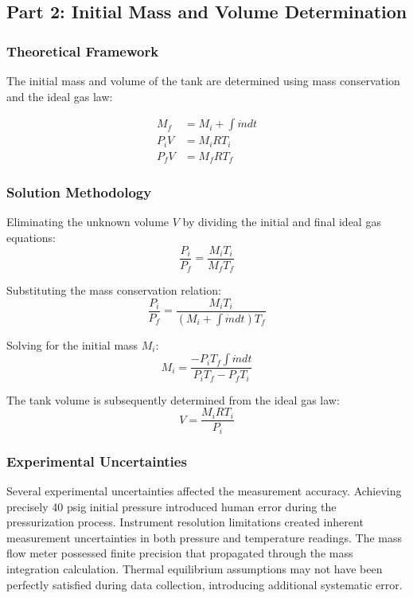 \documentclass{article} %
\begin{document}
\begin{multicols}{2}
\subsection{Part 2: Initial Mass and Volume Determination}

\subsubsection{Theoretical Framework}

The initial mass and volume of the tank are determined using mass conservation and the ideal gas law:

\begin{align}
M_f &= M_i + \int \dot{m}  dt \label{eq:mass_cons} \\
P_i V &= M_i R T_i \label{eq:ig_init} \\
P_f V &= M_f R T_f \label{eq:ig_final}
\end{align}

\subsubsection{Solution Methodology}

Eliminating the unknown volume $V$ by dividing the initial and final ideal gas equations:
\[
\frac{P_i}{P_f} = \frac{M_i T_i}{M_f T_f}
\]

Substituting the mass conservation relation:
\[
\frac{P_i}{P_f} = \frac{M_i T_i}{(M_i + \int \dot{m}  dt) T_f}
\]

Solving for the initial mass $M_i$:
\[
\boxed{M_i = \frac{-P_i T_f \int \dot{m}  dt}{P_i T_f - P_f T_i}}
\]

The tank volume is subsequently determined from the ideal gas law:
\[
V = \frac{M_i R T_i}{P_i}
\]

\subsubsection{Experimental Uncertainties}

Several experimental uncertainties affected the measurement accuracy. Achieving precisely 40 psig initial pressure introduced human error during the pressurization process. Instrument resolution limitations created inherent measurement uncertainties in both pressure and temperature readings. The mass flow meter possessed finite precision that propagated through the mass integration calculation. Thermal equilibrium assumptions may not have been perfectly satisfied during data collection, introducing additional systematic error.


\end{multicols}
\end{document}
